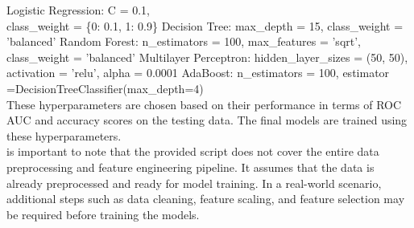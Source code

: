 \documentclass[a4, 10 pt, conference]{ieeeconf}  %
\begin{document}
{\begin{itemize}
\hspace*{0.5cm}Logistic Regression:\newline
\hspace*{1cm}C = 0.1,\\ \hspace*{1cm}class\_weight = \{0: 0.1, 1: 0.9\}\newline
\hspace*{0.5cm}Decision Tree:\newline
\hspace*{1cm}max\_depth = 15,\newline
\hspace*{1cm}class\_weight = 'balanced'\newline
\hspace*{0.5cm}Random Forest:\newline
\hspace*{1cm}n\_estimators = 100,\newline
\hspace*{1cm}max\_features = 'sqrt',\newline
\hspace*{1cm}class\_weight = 'balanced'\newline
\hspace*{0.5cm}Multilayer Perceptron:\newline
\hspace*{1cm}hidden\_layer\_sizes = (50, 50),\newline
\hspace*{1cm}activation = 'relu',\newline
\hspace*{1cm}alpha = 0.0001\newline
\hspace*{0.5cm}AdaBoost:\newline
\hspace*{1cm}n\_estimators = 100,\newline
\hspace*{1cm}estimator =DecisionTreeClassifier(max\_depth=4)\\

	\textbfn These hyperparameters are chosen based on their performance in terms of ROC AUC and accuracy scores on the testing data. The final models are trained using these hyperparameters.\\

	\textbfnIt is important to note that the provided script does not cover the entire data preprocessing and feature engineering pipeline. It assumes that the data is already preprocessed and ready for model training. In a real-world scenario, additional steps such as data cleaning, feature scaling, and feature selection may be required before training the models. 
\end{itemize}
}
\end{document}

